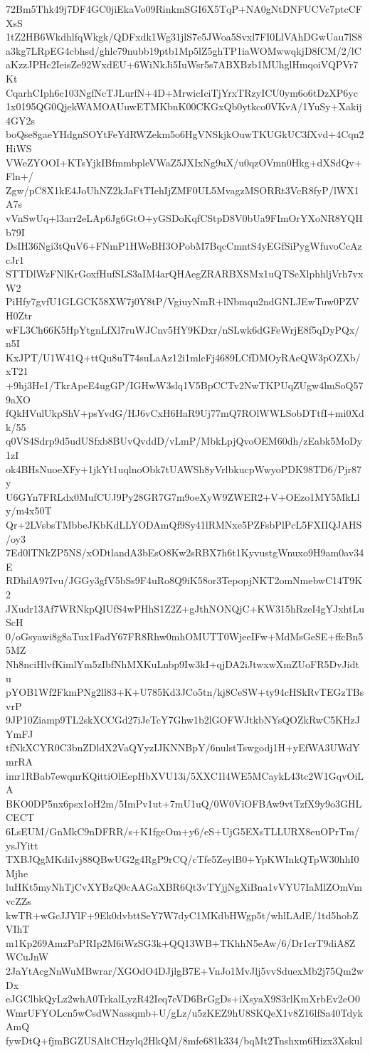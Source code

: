 72Bm5Thk49j7DF4GC0jiEkaVo09RinkmSGI6X5TqP+NA0gNtDNFUCVc7ptcCFXsS
1tZ2HB6WkdhlfqWkgk/QDFxdk1Wg31jlS7e5JWoa5Svxl7FI0LlVAhDGwUau7lS8
a3kg7LRpEG4cbhsd/ghlc79nubb19ptb1Mp5lZ5ghTP1iaWOMwwqkjD8fCM/2/lC
aKzzJPHc2IeisZe92WxdEU+6WiNkJi5IuWsr5s7ABXBzb1MUhglHmqoiVQPVr7Kt
CqarhCIph6c103NgfNcTJLurfN+4D+MrwicIciTjYrxTRzyICU0ym6o6tDzXP6yc
1x0195QG0QjekWAMOAUuwETMKbnK00CKGxQb0ytkco0VKvA/1YuSy+Xakij4GY2s
boQse8gaeYHdgnSOYtFeYdRWZekm5o6HgVNSkjkOuwTKUGkUC3fXvd+4Cqn2HiWS
VWeZYOOI+KTsYjkIBfmmbpleVWaZ5JXIxNg9uX/u0qzOVmn0Hkg+dXSdQv+Fln+/
Zgw/pC8X1kE4JoUhNZ2kJaFtTIehIjZMF0UL5MvagzMSORRt3VcR8fyP/lWX1A7s
vVnSwUq+l3arr2eLAp6Jg6GtO+yGSDoKqfCStpD8V0bUa9FImOrYXoNR8YQHb79I
DsIH36Ngi3tQuV6+FNmP1HWeBH3OPobM7BqcCmntS4yEGfSiPygWfuvoCcAzcJr1
STTDlWzFNlKrGoxfHufSLS3aIM4arQHAegZRARBXSMx1uQTSeXlphhljVrh7vxW2
PiHfy7gvfU1GLGCK58XW7j0Y8tP/VgiuyNmR+lNbmqu2ndGNLJEwTuw0PZVH0Ztr
wFL3Ch66K5HpYtgnLfXl7ruWJCnv5HY9KDxr/nSLwk6dGFeWrjE8f5qDyPQx/n5I
KxJPT/U1W41Q+ttQu8uT74suLaAz12i1mlcFj4689LCfDMOyRAeQW3pOZXb/xT21
+9hj3He1/TkrApeE4ugGP/IGHwW3slq1V5BpCCTv2NwTKPUqZUgw4lmSoQ579aXO
fQkHVulUkpShV+psYvdG/HJ6vCxH6HaR9Uj77mQ7ROlWWLSobDTtfI+mi0Xdk/55
q0VS4Sdrp9d5udUSfxb8BUvQvddD/vLmP/MbkLpjQvoOEM60dh/zEabk5MoDy1zI
ok4BHsNuoeXFy+1jkYt1uqlnoObk7tUAWSh8yVrlbkucpWwyoPDK98TD6/Pjr87y
U6GYn7FRLdx0MufCUJ9Py28GR7G7m9oeXyW9ZWER2+V+OEzo1MY5MkLly/m4x50T
Qr+2LVsbsTMbbeJKbKdLLYODAmQf9Sy41lRMNxe5PZFsbPlPcL5FXIIQJAHS/oy3
7Ed0lTNkZP5NS/xODtlandA3bEsO8Kw2sRBX7h6t1KyvustgWnuxo9H9am0av34E
RDhilA97Ivu/JGGy3gfV5bSs9F4uRo8Q9iK58or3TepopjNKT2omNmebwC14T9K2
JXudr13Af7WRNkpQIUfS4wPHhS1Z2Z+gJthNONQjC+KW315hRzeI4gYJxhtLuScH
0/oGsyawi8g8aTux1FadY67FR8Rhw0mhOMUTT0WjeeIFw+MdMsGeSE+ffcBn55MZ
Nh8nciHlvfKimlYm5zIbfNhMXKuLnbp9Iw3kI+qjDA2iJtwxwXmZUoFR5DvJidtu
pYOB1Wf2FkmPNg2ll83+K+U785Kd3JCo5tn/kj8CeSW+ty94cHSkRvTEGzTBsvrP
9JP10Ziamp9TL2skXCCGd27iJeTcY7Ghw1b2lGOFWJtkbNYsQOZkRwC5KHzJYmFJ
tfNkXCYR0C3bnZDldX2VaQYyzIJKNNBpY/6nulstTswgodj1H+yEfWA3UWdYmrRA
imr1RBab7ewqnrKQittiOlEepHbXVU13i/5XXC1l4WE5MCaykL43tc2W1GqvOiLA
BKO0DP5nx6psx1oH2m/5ImPv1ut+7mU1uQ/0W0ViOFBAw9vtTzfX9y9o3GHLCECT
6LsEUM/GnMkC9nDFRR/s+K1fgeOm+y6/eS+UjG5EXsTLLURX8euOPrTm/ysJYitt
TXBJQgMKdiIvj88QBwUG2g4RgP9rCQ/cTfe5ZeylB0+YpKWInkQTpW30hhI0Mjhe
luHKt5myNhTjCvXYBzQ0cAAGaXBR6Qt3vTYjjNgXiBna1vVYU7IaMlZOmVmvcZZs
kwTR+wGcJJYlF+9Ek0dvbttSeY7W7dyC1MKdbHWgp5t/whlLAdE/1td5hobZVIhT
m1Kp269AmzPaPRIp2M6iWzSG3k+QQ13WB+TKhhN5eAw/6/Dr1crT9diA8ZWCuJnW
2JaYtAcgNnWuMBwrar/XGOdO4DJjlgB7E+VnJo1MvJlj5vvSduexMb2j75Qm2wDx
eJGClbkQyLz2whA0TrkalLyzR42Ieq7eVD6BrGgDs+iXsyaX9S3rlKmXrbEv2eO0
WmrUFYOLcn5wCsdWNassqmb+U/gLz/u5zKEZ9hU8SKQeX1v8Z16lfSa40TdykAmQ
fywDtQ+fjmBGZUSAltCHzylq2HkQM/8mfe681k334/bqMt2Tnshxm6Hizx3Xskul
